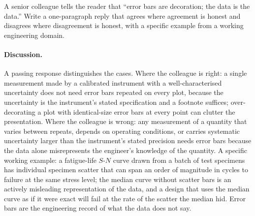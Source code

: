 \begin{exercise}
A senior colleague tells the reader that ``error bars are decoration;
the data is the data.'' Write a one-paragraph reply that agrees where
agreement is honest and disagrees where disagreement is honest, with
a specific example from a working engineering domain.

\paragraph{Discussion.}
A passing response distinguishes the cases. Where the colleague is
right: a single measurement made by a calibrated instrument with a
well-characterised uncertainty does not need error bars repeated
on every plot, because the uncertainty is the instrument's stated
specification and a footnote suffices; over-decorating a plot with
identical-size error bars at every point can clutter the
presentation. Where the colleague is wrong: any measurement of a
quantity that varies between repeats, depends on operating
conditions, or carries systematic uncertainty larger than the
instrument's stated precision needs error bars because the data
alone misrepresents the engineer's knowledge of the quantity.
A specific working example: a fatigue-life $S$-$N$ curve drawn
from a batch of test specimens has individual specimen scatter that
can span an order of magnitude in cycles to failure at the same
stress level; the median curve without scatter bars is an actively
misleading representation of the data, and a design that uses the
median curve as if it were exact will fail at the rate of the
scatter the median hid. Error bars are the engineering record of
what the data does not say.
\end{exercise}
